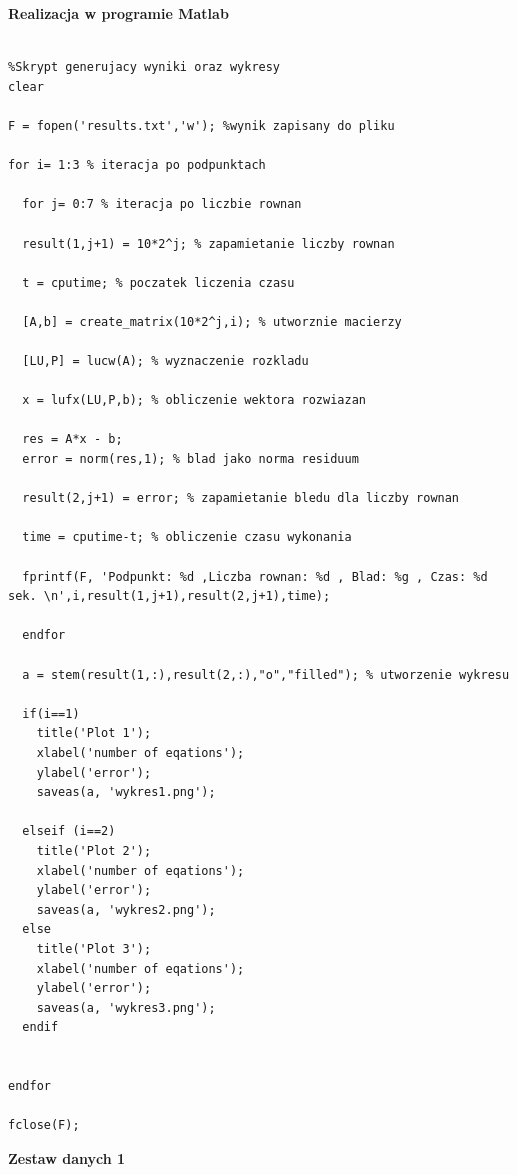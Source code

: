 \documentclass[a4paper, 11pt]{article}
\begin{document}
\textbf{Realizacja w programie Matlab}\\
\\
\begin{lstlisting}
%Skrypt generujacy wyniki oraz wykresy
clear

F = fopen('results.txt','w'); %wynik zapisany do pliku

for i= 1:3 % iteracja po podpunktach

  for j= 0:7 % iteracja po liczbie rownan
  
  result(1,j+1) = 10*2^j; % zapamietanie liczby rownan
  
  t = cputime; % poczatek liczenia czasu

  [A,b] = create_matrix(10*2^j,i); % utworznie macierzy

  [LU,P] = lucw(A); % wyznaczenie rozkladu
  
  x = lufx(LU,P,b); % obliczenie wektora rozwiazan
  
  res = A*x - b;
  error = norm(res,1); % blad jako norma residuum
  
  result(2,j+1) = error; % zapamietanie bledu dla liczby rownan
    
  time = cputime-t; % obliczenie czasu wykonania
  
  fprintf(F, 'Podpunkt: %d ,Liczba rownan: %d , Blad: %g , Czas: %d sek. \n',i,result(1,j+1),result(2,j+1),time);

  endfor
  
  a = stem(result(1,:),result(2,:),"o","filled"); % utworzenie wykresu
  
  if(i==1)
    title('Plot 1');
    xlabel('number of eqations');
    ylabel('error');
    saveas(a, 'wykres1.png');
  
  elseif (i==2) 
    title('Plot 2');
    xlabel('number of eqations');
    ylabel('error');
    saveas(a, 'wykres2.png');
  else
    title('Plot 3');
    xlabel('number of eqations');
    ylabel('error');
    saveas(a, 'wykres3.png');
  endif
 

endfor

fclose(F);
\end{lstlisting}


\vspace{1cm}
\textbf{Zestaw danych 1}\\
\\
\end{document}
